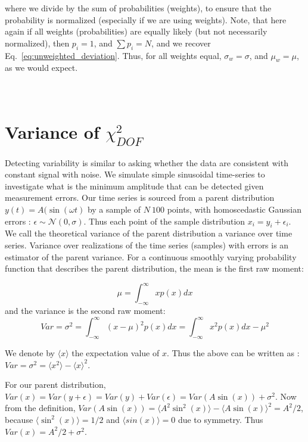 \documentclass[fleqn,usenatbib]{mnras}  %
\begin{document}
where we divide by the sum of probabilities (weights), to ensure that the probability is normalized (especially if we are using weights). Note, that here again if all weights (probabilities) are equally likely (but not necessarily normalized), then $p_{i} = 1$, and $\sum p_{i}= N$, and we recover Eq.~\ref{eq:unweighted_deviation}. Thus, for all weights equal, $\sigma_{w} = \sigma$, and $\mu_{w} = \mu$, as we would expect. 



\section{\\ Variance of $\chi^{2}_{DOF}$ }
\label{App:AppendixD}

Detecting variability is similar to asking whether the data are consistent with constant signal with noise. We simulate simple sinusoidal time-series to investigate what is the minimum amplitude that can be detected given measurement errors. Our time series is sourced from a parent distribution $y(t) = A(\sin(\omega t)$ by a sample of $N~100$ points, with homoscedastic Gaussian errors :  $\epsilon \sim \mathcal{N}(0,\sigma)$.  Thus each point of the sample distribution $x_{i} = y_{i} + \epsilon_{i}$. We call the theoretical variance of the parent distribution a variance over time series. Variance over realizations of the time series (samples) with errors is an estimator of the parent variance.  For a continuous smoothly varying probability function that describes the parent distribution, the mean is the first raw moment:

\begin{equation}
\mu = \int_{-\infty}^{\infty}{x p(x) dx}
\end{equation} 
and the variance is the second raw moment:
\begin{equation}
Var = \sigma^{2} =  \int_{-\infty}^{\infty}{(x-\mu)^{2} p(x) dx} =  \int_{-\infty}^{\infty}{x^{2} p(x) dx} - \mu^{2}
\end{equation}

We denote by $\langle x \rangle$ the expectation value of $x$. Thus the above can be written as : $Var= \sigma^{2} = \langle x^{2} \rangle - \langle x \rangle ^{2}$. 

For our parent distribution,  $Var(x) = Var(y+\epsilon) = Var(y) + Var(\epsilon) = Var(A \sin(x)) + \sigma^{2}$. Now from the definition, $Var(A\sin(x)) = \langle A^{2} \sin^{2}(x) \rangle - \langle A \sin(x) \rangle ^{2} = A^{2} / 2 $, because $\langle \sin^{2}(x) \rangle = 1/2$ and $\langle sin(x)\rangle = 0$ due to symmetry. Thus $Var(x) = A^{2}/2  + \sigma^{2}$. 
\end{document}
